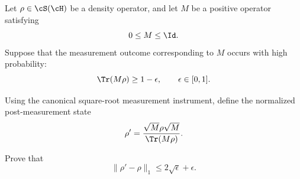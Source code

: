 Let $\rho\in \cS(\cH)$ be a density operator, and let $M$ be a positive operator satisfying
$$
0\leq M\leq \Id.
$$
Suppose that the measurement outcome corresponding to $M$ occurs with high probability:
$$
\Tr(M\rho)\geq 1-\epsilon,
\qquad
\epsilon\in [0,1].
$$

Using the canonical square-root measurement instrument, define the normalized post-measurement state
$$
\rho'
=
\frac{\sqrt{M}\rho\sqrt{M}}{\Tr(M\rho)}.
$$

Prove that
$$
\|\rho'-\rho\|_1
\leq
2\sqrt{\epsilon}+\epsilon.
$$
